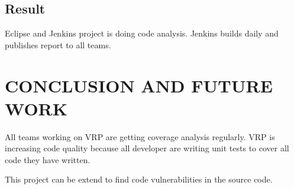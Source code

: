 \documentclass[a4paper,oneside,1,english1pt]{report}
\begin{document}
	\section{Result}
		Eclipse and Jenkins project is doing code analysis. Jenkins builds daily and publishes report to all teams.
		
				
\chapter{\uppercase{Conclusion and Future Work}}
	\par All teams working on \ac{VRP} are getting coverage analysis regularly. \ac{VRP} is increasing code quality because all developer are writing unit tests to cover all code they have written. 
	\par This project can be extend to find code vulnerabilities in the source code.
\clearpage





\nocite{*}
\end{document}

